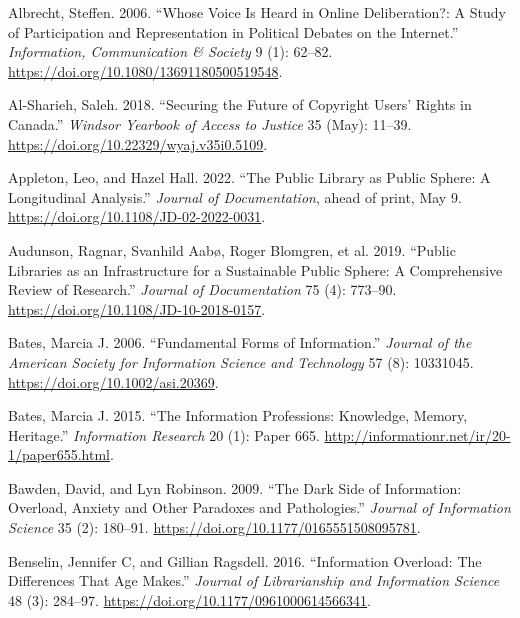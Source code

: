\documentclass[
  letterpaper,
  DIV=11,
  numbers=noendperiod]{scrreprt}
\newlength{\cslhangindent}
\newenvironment{CSLReferences}[2] %
 {\begin{list}{}{%
  \setlength{\itemindent}{0pt}
  \setlength{\leftmargin}{0pt}
  \setlength{\parsep}{0pt}
  \ifodd #1
   \setlength{\leftmargin}{\cslhangindent}
   \setlength{\itemindent}{-1\cslhangindent}
  \fi
  \setlength{\itemsep}{#2\baselineskip}}}
 {\end{list}}
\begin{document}
\protect{}\label{refs}
\begin{CSLReferences}{1}{1}
Albrecht, Steffen. 2006. {``Whose Voice Is Heard in Online
Deliberation?: A Study of Participation and Representation in Political
Debates on the Internet.''} \emph{Information, Communication \& Society}
9 (1): 62--82. \url{https://doi.org/10.1080/13691180500519548}.

Al-Sharieh, Saleh. 2018. {``Securing the {Future} of {Copyright}
{Users}' {Rights} in {Canada}.''} \emph{Windsor Yearbook of Access to
Justice} 35 (May): 11--39.
\url{https://doi.org/10.22329/wyaj.v35i0.5109}.

Appleton, Leo, and Hazel Hall. 2022. {``The Public Library as Public
Sphere: A Longitudinal Analysis.''} \emph{Journal of Documentation},
ahead of print, May 9. \url{https://doi.org/10.1108/JD-02-2022-0031}.

Audunson, Ragnar, Svanhild Aabø, Roger Blomgren, et al. 2019. {``Public
Libraries as an Infrastructure for a Sustainable Public Sphere: A
Comprehensive Review of Research.''} \emph{Journal of Documentation} 75
(4): 773--90. \url{https://doi.org/10.1108/JD-10-2018-0157}.

Bates, Marcia J. 2006. {``Fundamental Forms of Information.''}
\emph{Journal of the American Society for Information Science and
Technology} 57 (8): 10331045. \url{https://doi.org/10.1002/asi.20369}.

Bates, Marcia J. 2015. {``The Information Professions: Knowledge,
Memory, Heritage.''} \emph{Information Research} 20 (1): Paper 665.
\url{http://informationr.net/ir/20-1/paper655.html}.

Bawden, David, and Lyn Robinson. 2009. {``The Dark Side of Information:
Overload, Anxiety and Other Paradoxes and Pathologies.''} \emph{Journal
of Information Science} 35 (2): 180--91.
\url{https://doi.org/10.1177/0165551508095781}.

Benselin, Jennifer C, and Gillian Ragsdell. 2016. {``Information
Overload: {The} Differences That Age Makes.''} \emph{Journal of
Librarianship and Information Science} 48 (3): 284--97.
\url{https://doi.org/10.1177/0961000614566341}.


\end{CSLReferences}
\end{document}
